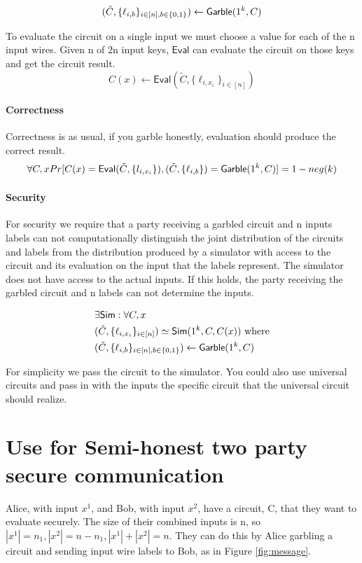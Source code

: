 \documentclass[12pt]{tufte-book}
\newcommand{\Eval}{\mathsf{Eval}}
\begin{document}
\[
(\tilde{C}, \{\ell_{i,b}\}_{i \in [n], b \in \{0,1\}}) \leftarrow \mathsf{Garble}(1^k, C) 
\]

To evaluate the circuit on a single input we must choose a value for each of the n input wires.
Given n of 2n input keys, $\Eval$ can evaluate the circuit on those keys and get the circuit result.
\[
C(x) \leftarrow \Eval(\tilde{C}, \{\ell_{i, x_i}\}_{i \in [n]}) 
\]

\paragraph{Correctness}
Correctness is as usual, if you garble honestly, evaluation should produce the correct result. 
\[
\forall C, x 
Pr[ C(x) = \Eval(\tilde{C}, \{l_{i, x_i}\}),  (\tilde{C}, \{\ell_{i,b}\}) = \Garble(1^k, C)] = 1 - neg(k)
\]


\paragraph{Security}
For security we require that a party receiving 
a garbled circuit and n inputs labels 
can not computationally distinguish the joint distribution of the circuits and labels
from the distribution produced by 
a simulator with access to the circuit and its evaluation on the input that the labels represent. 
The simulator does not have access to the actual inputs.
If this holds, the party receiving the garbled circuit and n labels can not determine the inputs.

\begin{align*}
&\exists \mathsf{Sim} : \forall C, x\\
&(\tilde{C}, \{\ell_{i,x_i}\}_{i \in [n]}) \simeq \mathsf{Sim}(1^k, C, C(x)) \text{ where} \\
&(\tilde{C}, \{\ell_{i,b}\}_{i \in [n], b \in \{0,1\}}) \leftarrow \mathsf{Garble}(1^k, C) 
\end{align*}

For simplicity we pass the circuit to the simulator.
You could also use universal circuits and pass 
in with the inputs the specific circuit that the universal circuit should realize. 



\section{Use for Semi-honest two party secure communication}
Alice, with input $x^1$, and Bob, with input $x^2$, have a circuit, C, that they want to evaluate securely. 
The size of their combined inputs is n, so $|x^1| = n_1, |x^2| = n - n_1, |x^1| + |x^2| = n$.
They can do this by Alice garbling a circuit and sending input wire labels to Bob, as in Figure \ref{fig:message}.
\end{document}
